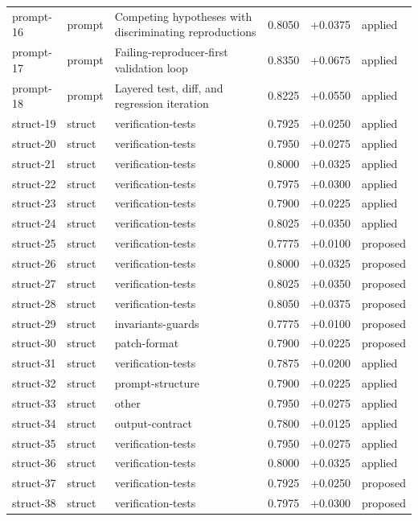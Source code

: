 \begin{center}
\begin{longtable}{llp{5.2cm}rrl}
prompt-16 & prompt & Competing hypotheses with discriminating reproductions & 0.8050 & +0.0375 & applied \\
prompt-17 & prompt & Failing-reproducer-first validation loop & 0.8350 & +0.0675 & applied \\
prompt-18 & prompt & Layered test, diff, and regression iteration & 0.8225 & +0.0550 & applied \\
struct-19 & struct & verification-tests & 0.7925 & +0.0250 & applied \\
struct-20 & struct & verification-tests & 0.7950 & +0.0275 & applied \\
struct-21 & struct & verification-tests & 0.8000 & +0.0325 & applied \\
struct-22 & struct & verification-tests & 0.7975 & +0.0300 & applied \\
struct-23 & struct & verification-tests & 0.7900 & +0.0225 & applied \\
struct-24 & struct & verification-tests & 0.8025 & +0.0350 & applied \\
struct-25 & struct & verification-tests & 0.7775 & +0.0100 & proposed \\
struct-26 & struct & verification-tests & 0.8000 & +0.0325 & proposed \\
struct-27 & struct & verification-tests & 0.8025 & +0.0350 & proposed \\
struct-28 & struct & verification-tests & 0.8050 & +0.0375 & proposed \\
struct-29 & struct & invariants-guards & 0.7775 & +0.0100 & proposed \\
struct-30 & struct & patch-format & 0.7900 & +0.0225 & proposed \\
struct-31 & struct & verification-tests & 0.7875 & +0.0200 & applied \\
struct-32 & struct & prompt-structure & 0.7900 & +0.0225 & applied \\
struct-33 & struct & other & 0.7950 & +0.0275 & applied \\
struct-34 & struct & output-contract & 0.7800 & +0.0125 & applied \\
struct-35 & struct & verification-tests & 0.7950 & +0.0275 & applied \\
struct-36 & struct & verification-tests & 0.8000 & +0.0325 & applied \\
struct-37 & struct & verification-tests & 0.7925 & +0.0250 & proposed \\
struct-38 & struct & verification-tests & 0.7975 & +0.0300 & proposed \\

\end{longtable}
\end{center}
